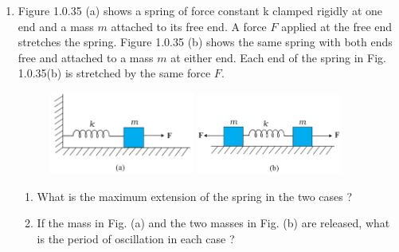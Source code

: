 \begin{enumerate}[label=\thesection.\arabic*,ref=\thesection.\theenumi]
\item Figure 1.0.35 (a) shows a spring of force constant k clamped rigidly at one end and a mass $m$ attached to its free end. A force $F$ applied at the free end stretches the spring. Figure 1.0.35 (b) shows the same spring with both ends free and attached to a mass $m$ at either end. Each end of the spring in Fig. 1.0.35(b) is stretched by the same force $F$.

\begin{figure}[ht]
\caption{ }
    \includegraphics[width=0.45\textwidth]{ncert-physics/11/14/13/figs/fig1.png}
    \includegraphics[width=0.45\textwidth]{ncert-physics/11/14/13/figs/fig2.png}
\end{figure}
\begin{enumerate}[label = (\alph*)]
  \item What is the maximum extension of the spring in the two cases ?    
  \item If the mass in Fig. (a) and the two masses in Fig. (b) are released, what is the
period of oscillation in each case ?
\end{enumerate}
    
\solution
\newpage


\end{enumerate}
